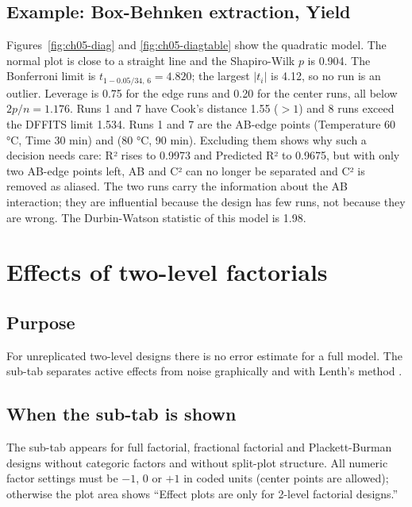 \subsection*{Example: Box-Behnken extraction, Yield}
Figures~\ref{fig:ch05-diag} and \ref{fig:ch05-diagtable} show the quadratic model. The normal plot is
close to a straight line and the Shapiro-Wilk $p$ is 0.904. The Bonferroni limit is
$t_{1-0.05/34,\,6}=4.820$; the largest $|t_i|$ is 4.12, so no run is an outlier. Leverage is 0.75 for the
edge runs and 0.20 for the center runs, all below $2p/n=1.176$. Runs 1 and 7 have Cook's distance 1.55
($>1$) and 8 runs exceed the DFFITS limit 1.534. Runs 1 and 7 are the AB-edge points (Temperature 60 °C,
Time 30 min) and (80 °C, 90 min). Excluding them shows why such a decision needs care: R² rises to 0.9973
and Predicted R² to 0.9675, but with only two AB-edge points left, AB and C² can no longer be separated and
C² is removed as aliased. The two runs carry the information about the AB interaction; they are influential
because the design has few runs, not because they are wrong. The Durbin-Watson statistic of this model is
1.98.

\section{Effects of two-level factorials}\label{sec:ch05-effects}

\subsection*{Purpose}
For unreplicated two-level designs there is no error estimate for a full model. The 
sub-tab separates active effects from noise graphically and with Lenth's method \citep{lenth1989}.

\subsection*{When the sub-tab is shown}
The sub-tab appears for full factorial, fractional factorial and Plackett-Burman designs without categoric
factors and without split-plot structure. All numeric factor settings must be $-1$, 0 or $+1$ in coded
units (center points are allowed); otherwise the plot area shows ``Effect plots are only for 2-level
factorial designs.''

